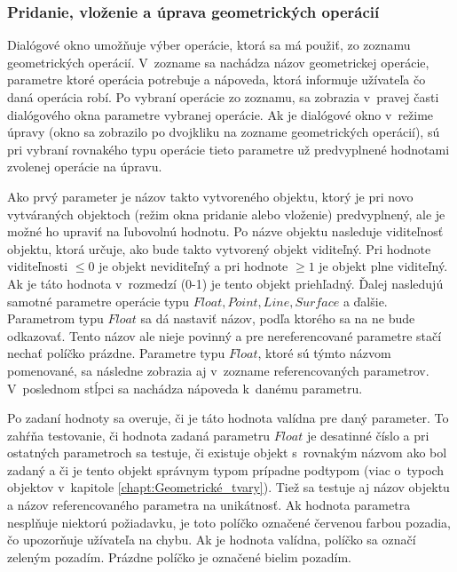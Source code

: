 

\subsubsection{Pridanie, vloženie a úprava geometrických operácií} 
Dialógové okno umožňuje výber operácie,  ktorá sa má použiť, zo zoznamu geometrických operácií. V~zozname sa nachádza názov geometrickej operácie, parametre ktoré operácia potrebuje a nápoveda, ktorá informuje užívateľa čo daná operácia robí.
Po vybraní operácie zo zoznamu, sa zobrazia v~pravej časti dialógového okna parametre vybranej operácie. Ak je dialógové okno v~režime úpravy (okno sa zobrazilo po dvojkliku na zozname geometrických operácií), sú pri vybraní rovnakého typu operácie tieto parametre už predvyplnené hodnotami zvolenej operácie na úpravu.

Ako prvý parameter je názov takto vytvoreného objektu, ktorý je pri novo vytváraných objektoch (režim okna pridanie alebo vloženie) predvyplnený, ale je možné ho upraviť na ľubovolnú hodnotu.  
Po názve objektu nasleduje viditeľnosť objektu, ktorá určuje, ako bude takto vytvorený objekt viditeľný. Pri hodnote viditeľnosti $\leq0$ je objekt neviditeľný a pri hodnote $\geq1$ je objekt plne viditeľný. Ak je táto hodnota v~rozmedzí (0-1) je tento objekt priehľadný. 
Ďalej nasledujú samotné parametre operácie typu $Float,  Point, Line, Surface$ a ďalšie. Parametrom typu $Float$ sa dá nastaviť názov, podľa ktorého sa na ne bude odkazovať. Tento názov ale nieje povinný a pre nereferencované parametre stačí nechať políčko prázdne. Parametre typu $Float$, ktoré sú týmto názvom pomenované, sa následne zobrazia aj v~zozname referencovaných parametrov.
V~poslednom stĺpci sa nachádza nápoveda k~danému parametru.

Po zadaní hodnoty sa overuje, či je táto hodnota valídna pre daný parameter. To zahŕňa testovanie, či hodnota zadaná parametru $Float$ je desatinné číslo a pri ostatných parametroch sa testuje, či existuje objekt s~rovnakým názvom ako bol zadaný a či je tento objekt správnym typom prípadne podtypom (viac o~typoch objektov v~kapitole  \ref{chapt:Geometrické_tvary}). Tiež sa testuje aj názov objektu a názov referencovaného parametra na unikátnosť.
Ak hodnota parametra nesplňuje niektorú požiadavku, je toto políčko označené červenou farbou pozadia, čo upozorňuje užívateľa na chybu. Ak je hodnota valídna, políčko sa označí zeleným pozadím. Prázdne políčko je označené bielim pozadím. 

